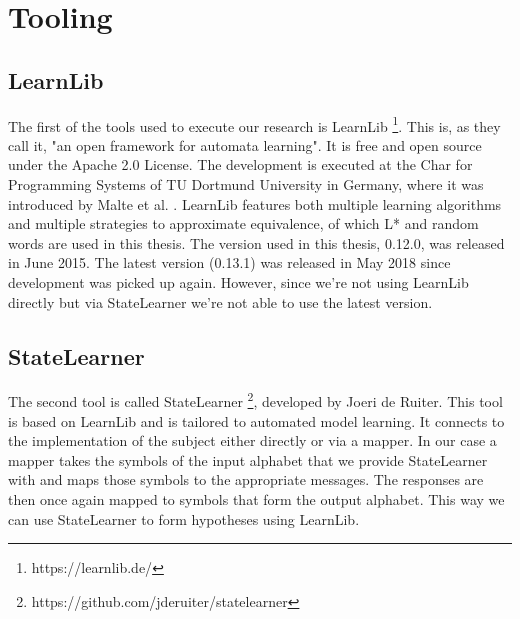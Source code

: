 \section{Tooling}

\subsection{LearnLib}

The first of the tools used to execute our research is LearnLib \footnote{https://learnlib.de/}. This is, as they call it, "an open framework for automata learning". It is free and open source under the Apache 2.0 License. The development is executed at the Char for Programming Systems of TU Dortmund University in Germany, where it was introduced by Malte et al. \cite{Malte:2015}. 
LearnLib features both multiple learning algorithms and multiple strategies to approximate equivalence, of which L* and random words are used in this thesis.
The version used in this thesis, 0.12.0, was released in June 2015. The latest version (0.13.1) was released in May 2018 since development was picked up again. However, since we're not using LearnLib directly but via StateLearner we're not able to use the latest version.

\subsection{StateLearner}

The second tool is called StateLearner \footnote{https://github.com/jderuiter/statelearner}, developed by Joeri de Ruiter. This tool is based on LearnLib and is tailored to automated model learning. It connects to the implementation of the subject either directly or via a mapper. In our case a mapper takes the symbols of the input alphabet that we provide StateLearner with and maps those symbols to the appropriate messages. The responses are then once again mapped to symbols that form the output alphabet. This way we can use StateLearner to form hypotheses using LearnLib.